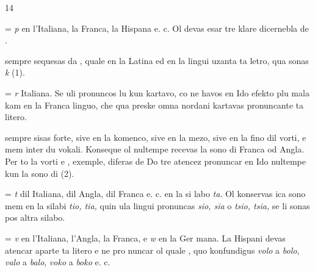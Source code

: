 \begin{VUpage}[18]{14}

 = \textit{p} en l'Italiana, la Franca, la Hispana e. c. Ol devas\nl
esar tre klare dicernebla de .

\VUblancAlinea
{} sempre sequesas da , quale en la Latina ed en la lingui\nl
uzanta ta letro, qua sonas \textit{k} (1).

\VUblancAlinea
{} = \textit{r} Italiana. Se uli pronuncos lu kun kartavo, co ne\nl
havos en Ido efekto plu mala kam en la Franca linguo, che\nl
qua preske omna nordani kartavas pronuncante ta litero.

\VUblancAlinea
{} sempre sisas forte, sive en la komenco, sive en la mezo,\nl
sive en la fino dil vorti, e mem inter du vokali. Konseque ol\nl
nultempe recevas la sono di  Franca od Angla. Per to la\nl
vorti  e , exemple, diferas de \nl
Do tre atencez pronuncar en Ido nultempe  kun la sono\nl
di  (2).

\VUblancAlinea
{} = \textit{t} dil Italiana, dil Angla, dil Franca e. c. en la si\cc
labo \textit{ta}. Ol konservas ica sono mem en la silabi \textit{tio, tia,}\nl
quin ula lingui pronuncas \textit{sio, sia} o \textit{tsio, tsia,} se li sonas pos\nl
altra silabo.

\VUblancAlinea
{} = \textit{v} en l'Italiana, l'Angla, la Franca, e \textit{w} en la Ger\cc
mana. La Hispani devas atencar aparte ta litero e ne pro\cc
nuncar ol quale , quo konfundigus \textit{volo} a \textit{bolo}, \textit{valo} a \textit{balo},\nl
\textit{voko} a \textit{boko} e. c.


\end{VUpage}

